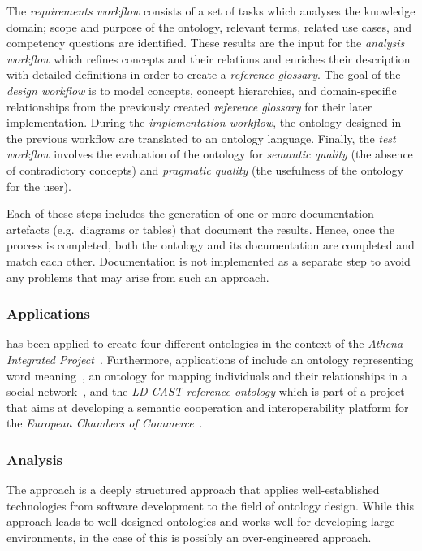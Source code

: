 The \emph{requirements workflow} consists of a set of tasks which analyses the knowledge domain; scope and purpose of the ontology, relevant terms, related use cases, and competency questions are identified. These results are the input for the \emph{analysis workflow} which refines concepts and their relations and enriches their description with detailed definitions in order to create a \emph{reference glossary}. The goal of the \emph{design workflow} is to model concepts, concept hierarchies, and domain-specific relationships from the previously created \emph{reference glossary} for their later implementation.
During the \emph{implementation workflow}, the ontology designed in the previous workflow are translated to an ontology language. Finally, the \emph{test workflow} involves the evaluation of the ontology for \emph{semantic quality} (the absence of contradictory concepts) and \emph{pragmatic quality} (the usefulness of the ontology for the user).

Each of these steps includes the generation of one or more documentation artefacts (e.g.\ diagrams or tables) that document the results. Hence, once the  process is completed, both the ontology and its documentation are completed and match each other. Documentation is not implemented as a separate step to avoid any problems that may arise from such an approach.

\subsubsection{Applications}

 has been applied to create four different ontologies in the context of the \emph{Athena Integrated Project}~\cite{AthenaProject}. Furthermore, applications of  include an ontology representing word meaning~\cite{upon_example1}, an ontology for mapping individuals and their relationships in a social network~\cite{upon_example2}, and the \emph{LD-CAST reference ontology} which is part of a project that aims at developing a semantic cooperation and interoperability platform for the \emph{European Chambers of Commerce}~\cite{upon_example3,ld_cast}.

\subsubsection{Analysis}

The  approach is a deeply structured approach that applies well-established technologies from software development to the field of ontology design. While this approach leads to well-designed ontologies and works well for developing large environments, in the case of \smarthomeweather this is possibly an over-engineered approach.

